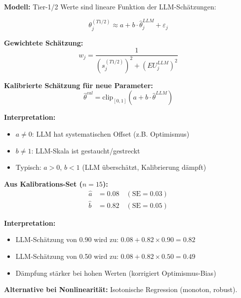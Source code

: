 \begin{tcolorbox}[colback=gray!5!white, colframe=gray!75!black,
    title=\textbf{Axiom UNMAPPED_CAL-2: Lineare Kalibrierungstransformation}]

\textbf{Modell:} Tier-1/2 Werte sind lineare Funktion der LLM-Schätzungen:

\begin{equation}
\theta_j^{(T1/2)} \approx a + b \cdot \hat{\theta}_j^{LLM} + \varepsilon_j
\end{equation}

\textbf{Gewichtete Schätzung:}
\begin{equation}
\boxed{w_j = \frac{1}{(s_j^{(T1/2)})^2 + (EU_j^{LLM})^2}}
\end{equation}

\textbf{Kalibrierte Schätzung für neue Parameter:}
\begin{equation}
\boxed{\hat{\theta}^{cal} = \text{clip}_{[0,1]}(a + b \cdot \hat{\theta}^{LLM})}
\end{equation}

\textbf{Interpretation:}
\begin{itemize}[nosep]
    \item $a \neq 0$: LLM hat systematischen Offset (z.B. Optimismus)
    \item $b \neq 1$: LLM-Skala ist gestaucht/gestreckt
    \item Typisch: $a > 0$, $b < 1$ (LLM überschätzt, Kalibrierung dämpft)
\end{itemize}

\end{tcolorbox}

\begin{tcolorbox}[colback=yellow!5!white, colframe=yellow!75!black,
    title=\textbf{Beispiel: Kalibrierungs-Fit}]

\textbf{Aus Kalibrations-Set ($n = 15$):}
\begin{align*}
\hat{a} &= 0.08 \quad (\text{SE} = 0.03) \\
\hat{b} &= 0.82 \quad (\text{SE} = 0.05)
\end{align*}

\textbf{Interpretation:}
\begin{itemize}[nosep]
    \item LLM-Schätzung von 0.90 wird zu: $0.08 + 0.82 \times 0.90 = 0.82$
    \item LLM-Schätzung von 0.50 wird zu: $0.08 + 0.82 \times 0.50 = 0.49$
    \item Dämpfung stärker bei hohen Werten (korrigiert Optimismus-Bias)
\end{itemize}

\textbf{Alternative bei Nonlinearität:} Isotonische Regression (monoton, robust).

\end{tcolorbox}

